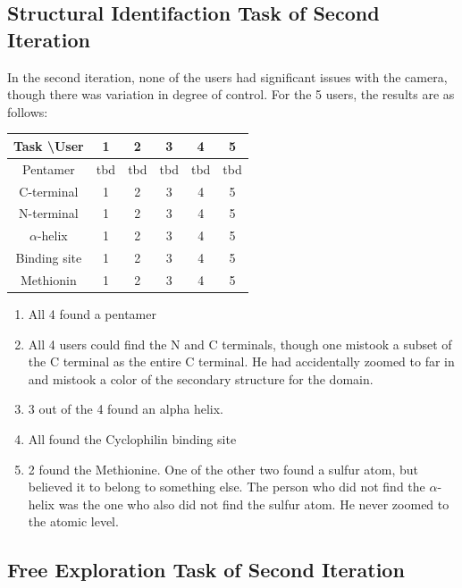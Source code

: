 \documentclass[review,journal]{vgtc}         %
\begin{document}
\subsection{Structural Identifaction Task of Second Iteration}
In the second iteration, none of the users had significant issues with the camera, though there was variation in degree of control.
For the 5 users, the results are as follows:

\begin{tabular}{| c | c | c | c | c | c |}
	\hline
	Task \textbackslash User & 1 & 2 & 3 & 4 & 5 \\
	\hline
	Pentamer& tbd & tbd & tbd & tbd & tbd \\
	\hline
	C-terminal & 1 & 2 & 3 & 4 & 5 \\
	\hline
	N-terminal & 1 & 2 & 3 & 4 & 5 \\
	\hline
	$\alpha$-helix & 1 & 2 & 3 & 4 & 5 \\
	\hline
	Binding site & 1 & 2 & 3 & 4 & 5 \\
	\hline
	Methionin & 1 & 2 & 3 & 4 & 5 \\
	\hline
\end{tabular}



\begin{enumerate}
	\item All 4 found a pentamer
	\item All 4 users could find the N and C terminals, though one mistook a subset of the C terminal as the entire C terminal. He had accidentally zoomed to far in and mistook a color of the secondary structure for the domain.
	\item 3 out of the 4 found an alpha helix.
	\item All found the Cyclophilin binding site
	\item 2 found the Methionine. One of the other two found a sulfur atom, but believed it to belong to something else. The person who did not find the $\alpha$-helix was the one who also did not find the sulfur atom. He never zoomed to the atomic level.
\end{enumerate}




\subsection{Free Exploration Task of Second Iteration}
\end{document}
